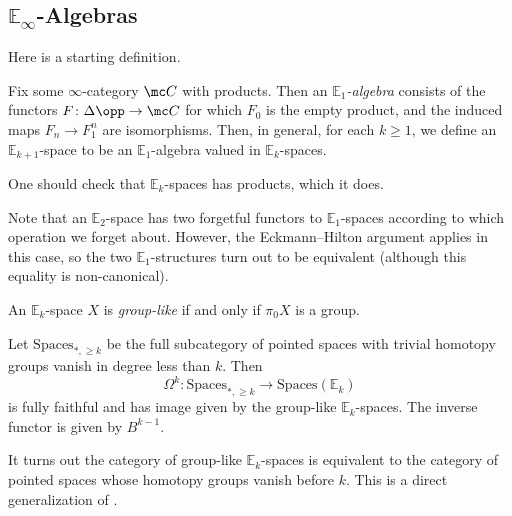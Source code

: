 \documentclass[../notes.tex]{subfiles}
\begin{document}
\subsection{\texorpdfstring{$\mathbb E_\infty$}{ E infinity}-Algebras}
Here is a starting definition.
\begin{defihelper} 
	Fix some $\infty$-category $\mc C$ with products. Then an \textit{$\mathbb E_1$-algebra} consists of the functors $F\colon\Delta\opp\to\mc C$ for which $F_0$ is the empty product, and the induced maps $F_n\to F_1^n$ are isomorphisms. Then, in general, for each $k\ge1$, we define an $\mathbb E_{k+1}$-space to be an $\mathbb E_1$-algebra valued in $\mathbb E_k$-spaces.
\end{defihelper}
\begin{remark}
	One should check that $\mathbb E_k$-spaces has products, which it does.
\end{remark}
\begin{remark}
	Note that an $\mathbb E_2$-space has two forgetful functors to $\mathbb E_1$-spaces according to which operation we forget about. However, the Eckmann--Hilton argument applies in this case, so the two $\mathbb E_1$-structures turn out to be equivalent (although this equality is non-canonical).
\end{remark}
\begin{definition}
	An $\mathbb E_k$-space $X$ is \textit{group-like} if and only if $\pi_0X$ is a group.
\end{definition}
\begin{theorem} \label{thm:may-recog}
	Let $\mathrm{Spaces}_{*,\ge k}$ be the full subcategory of pointed spaces with trivial homotopy groups vanish in degree less than $k$. Then
	\[\Omega^k\colon\mathrm{Spaces}_{*,\ge k}\to\mathrm{Spaces}(\mathbb E_k)\]
	is fully faithful and has image given by the group-like $\mathbb E_k$-spaces. The inverse functor is given by $B^{k-1}$.
\end{theorem}
\begin{remark}
	It turns out the category of group-like $\mathbb E_k$-spaces is equivalent to the category of pointed spaces whose homotopy groups vanish before $k$. This is a direct generalization of .
\end{remark}
\end{document}
